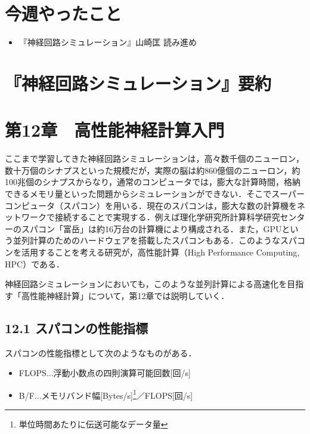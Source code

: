 \documentclass[dvipdfmx, A4j, twocolumn, 10.5pt]{jsarticle}
\begin{document}



\section{今週やったこと}
\begin{itemize}
 \item 『神経回路シミュレーション』山崎匡 読み進め

\end{itemize}
\section{『神経回路シミュレーション』要約}


\section*{第12章　高性能神経計算入門}
ここまで学習してきた神経回路シミュレーションは，高々数千個のニューロン，数十万個のシナプスといった規模だが，実際の脳は約860億個のニューロン，約100兆個のシナプスからなり，通常のコンピュータでは，膨大な計算時間，格納できるメモリ量といった問題からシミュレーションができない．そこでスーパーコンピュータ（スパコン）を用いる．現在のスパコンは，膨大な数の計算機をネットワークで接続することで実現する．例えば理化学研究所計算科学研究センターのスパコン「富岳」は約16万台の計算機により構成される．また，GPUという並列計算のためのハードウェアを搭載したスパコンもある．このようなスパコンを活用することを考える研究が，高性能計算（High Performance Computing, HPC）である．

神経回路シミュレーションにおいても，このような並列計算による高速化を目指す「高性能神経計算」について，第12章では説明していく．

\subsection*{12.1 スパコンの性能指標}

スパコンの性能指標として次のようなものがある．

\begin{itemize}
\renewcommand{\labelitemi}{}
 \item FLOPS...浮動小数点の四則演算可能回数[回/s]
 \item B/F...メモリバンド幅[Bytes/s]\footnote{単位時間あたりに伝送可能なデータ量}／FLOPS[回/s]
\end{itemize}
\end{document}
